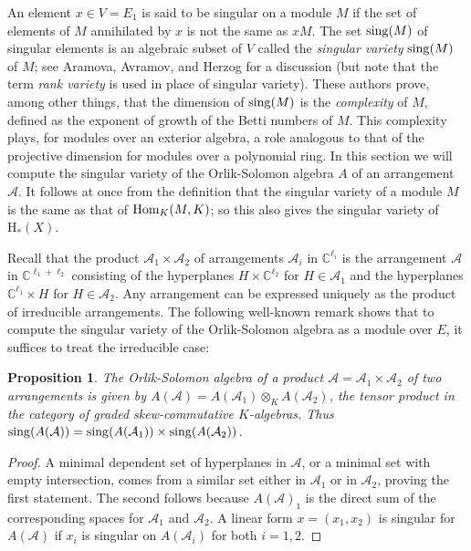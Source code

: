 \documentclass{tran-l}
\newtheorem{proposition}[theorem]{Proposition}
\theoremstyle{definition}
\theoremstyle{remark}
\newcommand{\CC}{{\mathbb{C}}}
\newcommand{\Acal}{{{\mathcal A}}}
\newcommand{\sing}{\mathop{\rm sing}\nolimits}
\newcommand{\Hom}{\mathop{\rm Hom}\nolimits}
\newcommand{\rH}{{\mathrm H}}
\begin{document}
An element $x\in V= E_1$ is said to be singular on a module $M$ if the
set of elements of $M$ annihilated by $x$ is not the same as $xM$.
The set $\sing(M)$ of singular elements is an algebraic subset of $V$
called the {\it singular variety\/} $\sing(M)$ of $M$; 
see Aramova, Avramov, and
Herzog \cite{AAH} for a discussion (but note that the term 
{\it rank variety\/} is used in place of singular variety). 
These authors prove, among other
things, that the dimension of $\sing(M)$ is
the {\it complexity\/} of $M$, defined as the exponent of growth of
the Betti numbers of $M$. This complexity plays, for
modules over an exterior algebra, a role analogous to that of the
projective dimension for modules over a polynomial ring. In this
section we will compute the singular variety of the Orlik-Solomon algebra $A$
of an arrangement $\Acal$. It follows at once from the definition that
the singular variety of a module $M$ is the same as that of $\Hom_K(M,
K)$; so this also gives the singular variety of $\rH_*(X)$.


Recall that the product $\Acal_1\times\Acal_2$ of
arrangements $\Acal_i$ in $ \CC^{\ell_i}$ is the arrangement $\Acal$
in $\CC^{\ell_1+\ell_2}$ consisting of the hyperplanes
$H\times \CC^{\ell_2}$ for $H\in \Acal_1$ and the hyperplanes
$\CC^{\ell_1}\times H$ for $H\in \Acal_2$. Any arrangement can
be expressed uniquely as the product of irreducible arrangements.
The following well-known remark shows that to compute the singular variety
of the Orlik-Solomon algebra as a module over $E$, it suffices to
treat the irreducible case:

\begin{proposition}\label{tensorproduct} 
The Orlik-Solomon algebra of a product
$\Acal=\Acal_1\times\Acal_2$ of two arrangements is given by
$A(\Acal)=A(\Acal_1) \otimes_K A(\Acal_2)$, the tensor product
in the category of graded skew-commutative $K$-algebras. Thus
$\sing(A(\Acal))=\sing(A(\Acal_1))\times \sing(A(\Acal_2))$.
\end{proposition}

\begin{proof} A minimal dependent set of hyperplanes
in $\Acal$, or a minimal set with empty intersection, comes from
a similar set either in $\Acal_1$ or in $\Acal_2$,
proving the first statement. The second follows because 
$A(\Acal)_1$ is the direct sum of the corresponding spaces for
$\Acal_1$ and $\Acal_2$. A linear form $x=(x_1,x_2)$ is singular for
$A(\Acal)$ if $x_i$ is singular on $A(\Acal_i)$ for both $i=1,2$.\end{proof}
\end{document}

